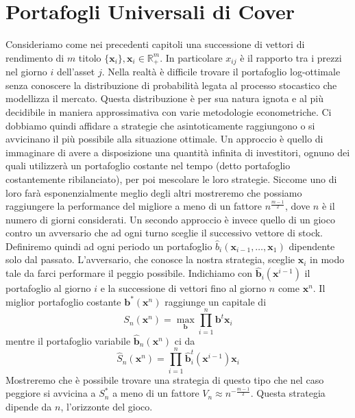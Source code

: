 \documentclass[a4paper,11pt]{book}
\theoremstyle{plain}
\theoremstyle{definition}
\theoremstyle{remark}
\newcommand{\R}{\mathbb{R}}
\newcommand{\x}{\bm{x}}
\newcommand{\B}{\bm{b}}
\newcommand{\bh}{\hat{\bm{b}}}
\newcommand{\Sh}{\hat{S}}
\begin{document}
\chapter{Portafogli Universali di Cover}
Consideriamo come nei precedenti capitoli una successione di vettori di rendimento di $m$ titolo $\{\x_i\}, \x_i\in \R^{m}_+$. In particolare $x_{ij}$ è il rapporto tra i prezzi nel giorno $i$ dell'asset $j$.\newline
Nella realtà è difficile trovare il portafoglio log-ottimale senza conoscere la distribuzione di probabilità legata al processo stocastico che modellizza il mercato. Questa distribuzione è per sua natura ignota e al più decidibile in maniera approssimativa con varie metodologie econometriche. Ci dobbiamo quindi affidare a strategie che asintoticamente raggiungono o si avvicinano il più possibile alla situazione ottimale.\newline
Un approccio è quello di immaginare di avere a disposizione una quantità infinita di investitori, ognuno dei quali utilizzerà un portafoglio costante nel tempo (detto portafoglio costantemente ribilanciato), per poi mescolare le loro strategie. Siccome uno di loro farà esponenzialmente meglio degli altri mostreremo che possiamo raggiungere la performance del migliore a meno di un fattore $n^{\frac{m-1}{2}}$, dove $n$ è il numero di giorni considerati.\newline
Un secondo approccio è invece quello di un gioco contro un avversario che ad ogni turno sceglie il successivo vettore di stock. Definiremo quindi ad ogni periodo un portafoglio $\hat{b}_i(\x_{i-1},\ldots,\x_1)$ dipendente solo dal passato. L'avversario, che conosce la nostra strategia, sceglie $\x_i$ in modo tale da farci performare il peggio possibile. Indichiamo con
$\bh_i(\x^{i-1})$ il portafoglio al giorno $i$ e la successione di vettori fino al giorno $n$ come $\x^n$.\newline
Il miglior portafoglio costante $\B^*(\x^n)$ raggiunge un capitale di
\begin{equation*}
	S_n(\x^n) = \max\limits_{\bm{b}}\prod_{i = 1}^n{\B^t\x_i}
\end{equation*}
mentre il portafoglio variabile $\bh_n(\x^n)$ ci da
\begin{equation*}
\Sh_n(\x^n)=\prod_{i = 1}^n{\bh_i^t(\x^{i-1})\x_i}
\end{equation*}
Mostreremo che è possibile trovare una strategia di questo tipo che nel caso peggiore si avvicina a $S^*_n$ a meno di un fattore $V_n\approx n^{-\frac{m-1}{2}}$. Questa strategia dipende da $n$, l'orizzonte del gioco.
\end{document}
